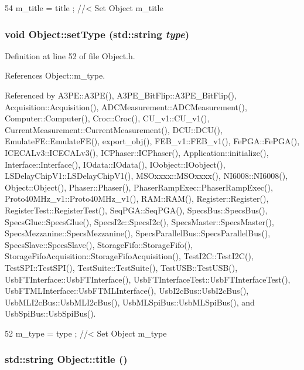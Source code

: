 \begin{DoxyCode}
54 { m_title = title ; } //< Set Object m_title
\end{DoxyCode}
\hypertarget{classObject_aae534cc9d982bcb9b99fd505f2e103a5}{
\subsubsection[{setType}]{\setlength{\rightskip}{0pt plus 5cm}void Object::setType (std::string {\em type})}}
\label{classObject_aae534cc9d982bcb9b99fd505f2e103a5}


Definition at line 52 of file Object.h.

References Object::m\_\-type.

Referenced by A3PE::A3PE(), A3PE\_\-BitFlip::A3PE\_\-BitFlip(), Acquisition::Acquisition(), ADCMeasurement::ADCMeasurement(), Computer::Computer(), Croc::Croc(), CU\_\-v1::CU\_\-v1(), CurrentMeasurement::CurrentMeasurement(), DCU::DCU(), EmulateFE::EmulateFE(), export\_\-obj(), FEB\_\-v1::FEB\_\-v1(), FePGA::FePGA(), ICECALv3::ICECALv3(), ICPhaser::ICPhaser(), Application::initialize(), Interface::Interface(), IOdata::IOdata(), IOobject::IOobject(), LSDelayChipV1::LSDelayChipV1(), MSOxxxx::MSOxxxx(), NI6008::NI6008(), Object::Object(), Phaser::Phaser(), PhaserRampExec::PhaserRampExec(), Proto40MHz\_\-v1::Proto40MHz\_\-v1(), RAM::RAM(), Register::Register(), RegisterTest::RegisterTest(), SeqPGA::SeqPGA(), SpecsBus::SpecsBus(), SpecsGlue::SpecsGlue(), SpecsI2c::SpecsI2c(), SpecsMaster::SpecsMaster(), SpecsMezzanine::SpecsMezzanine(), SpecsParallelBus::SpecsParallelBus(), SpecsSlave::SpecsSlave(), StorageFifo::StorageFifo(), StorageFifoAcquisition::StorageFifoAcquisition(), TestI2C::TestI2C(), TestSPI::TestSPI(), TestSuite::TestSuite(), TestUSB::TestUSB(), UsbFTInterface::UsbFTInterface(), UsbFTInterfaceTest::UsbFTInterfaceTest(), UsbFTMLInterface::UsbFTMLInterface(), UsbI2cBus::UsbI2cBus(), UsbMLI2cBus::UsbMLI2cBus(), UsbMLSpiBus::UsbMLSpiBus(), and UsbSpiBus::UsbSpiBus().


\begin{DoxyCode}
52 { m_type  = type  ; } //< Set Object m_type
\end{DoxyCode}
\hypertarget{classObject_a73a0f1a41828fdd8303dd662446fb6c3}{
\subsubsection[{title}]{\setlength{\rightskip}{0pt plus 5cm}std::string Object::title ()}}
\label{classObject_a73a0f1a41828fdd8303dd662446fb6c3}


